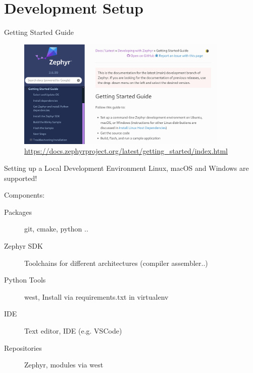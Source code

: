 \documentclass[10pt, aspectratio=169]{beamer}
\begin{document}
\section{Development Setup}
\begin{frame}[fragile]{Getting Started Guide}
  \begin{figure}
    \includegraphics[width=0.9\textwidth]{images/zephyr_getting_started.png}
    \caption*{\scriptsize\href{https://docs.zephyrproject.org/latest/getting_started/index.html}{https://docs.zephyrproject.org/latest/getting\_started/index.html}}
  \end{figure}
\end{frame}
\begin{frame}[fragile]{Setting up a Local Development Environment}
Linux, macOS and Windows are supported!

Components:
  \begin{description}
    \item [Packages] git, cmake, python ..
    \item [Zephyr SDK] Toolchains for different architectures (compiler assembler..)
    \item [Python Tools] west, Install via requirements.txt in virtualenv
    \item [IDE] Text editor, IDE (e.g. VSCode)
    \item [Repositories] Zephyr, modules via west
  \end{description}
\end{frame}
\end{document}
